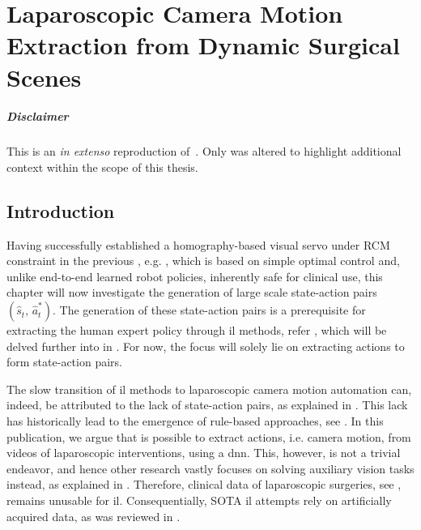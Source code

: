 \graphicspath{{chapter_3}}
\chapter[Laparoscopic Camera Motion Extraction]{Laparoscopic Camera Motion Extraction from Dynamic Surgical Scenes}
\label{chap:camera_motion_extraction}
\minitoc

\paragraph{Disclaimer} This  is an \textit{in extenso} reproduction of~\cite{huber2022deep}. Only  was altered to highlight additional context within the scope of this thesis.

\newpage

\section{Introduction}
\label{c3:sec:introduction}
Having successfully established a homography-based visual servo under RCM constraint in the previous , e.g. , which is based on simple optimal control and, unlike end-to-end learned robot policies, inherently safe for clinical use, this chapter will now investigate the generation of large scale state-action pairs $(\hat{s}_t,\,\hat{a}^*_t)$. The generation of these state-action pairs is a prerequisite for extracting the human expert policy through \acrshort{il} methods, refer , which will be delved further into in . For now, the focus will solely lie on extracting actions to form state-action pairs.

The slow transition of \acrshort{il} methods to laparoscopic camera motion automation can, indeed, be attributed to the lack of state-action pairs, as explained in . This lack has historically lead to the emergence of rule-based approaches, see . In this publication, we argue that is possible to extract actions, i.e. camera motion, from videos of laparoscopic interventions, using a \acrfull{dnn}. This, however, is not a trivial endeavor, and hence other research vastly focuses on solving auxiliary vision tasks instead, as explained in . Therefore, clinical data of laparoscopic surgeries, see , remains unusable for \acrshort{il}. Consequentially, SOTA \acrshort{il} attempts rely on artificially acquired data, as was reviewed in .

